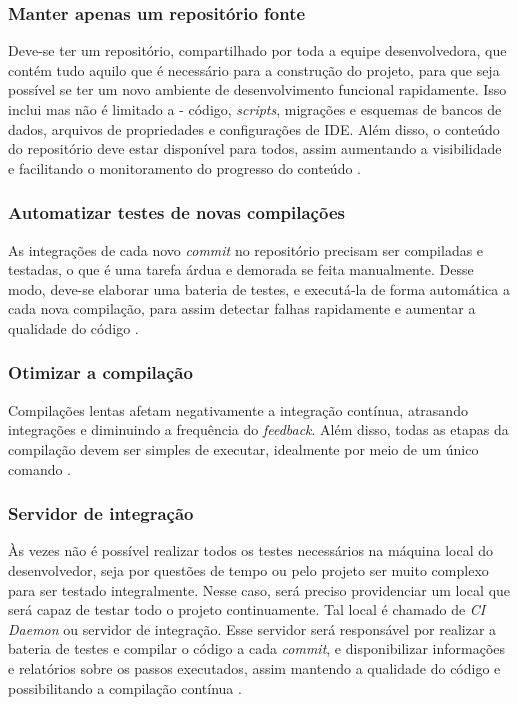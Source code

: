 \subsubsection{Manter apenas um repositório fonte}
Deve-se ter um repositório, compartilhado por toda a equipe desenvolvedora, que contém tudo aquilo que é necessário para a construção do projeto, para que seja possível se ter um novo ambiente de desenvolvimento funcional rapidamente. Isso inclui mas não é limitado a - código, \emph{scripts}, migrações e esquemas de bancos de dados, arquivos de propriedades e configurações de IDE. Além disso, o conteúdo do repositório deve estar disponível para todos, assim aumentando a visibilidade e facilitando o monitoramento do progresso do conteúdo \cite{gitlab-ci-cd,martin-fowler-continuous-integration}.

\subsubsection{Automatizar testes de novas compilações}
As integrações de cada novo \emph{commit} no repositório precisam ser compiladas e testadas, o que é uma tarefa árdua e demorada se feita manualmente. Desse modo, deve-se elaborar uma bateria de testes, e executá-la de forma automática a cada nova compilação, para assim detectar falhas rapidamente e aumentar a qualidade do código \cite{gitlab-ci-cd,martin-fowler-continuous-integration}.

\subsubsection{Otimizar a compilação}
Compilações lentas afetam negativamente a integração contínua, atrasando integrações e diminuindo a frequência do \emph{feedback}. Além disso, todas as etapas da compilação devem ser simples de executar, idealmente por meio de um único comando \cite{martin-fowler-continuous-integration}.

\subsubsection{Servidor de integração}
Às vezes não é possível realizar todos os testes necessários na máquina local do desenvolvedor, seja por questões de tempo ou pelo projeto ser muito complexo para ser testado integralmente. Nesse caso, será preciso providenciar um local que será capaz de testar todo o projeto continuamente. Tal local é chamado de \emph{CI Daemon} ou servidor de integração. Esse servidor será responsável por realizar a bateria de testes e compilar o código a cada \emph{commit}, e disponibilizar informações e relatórios sobre os passos executados, assim mantendo a qualidade do código e possibilitando a compilação contínua \cite{martin-fowler-continuous-integration}.

